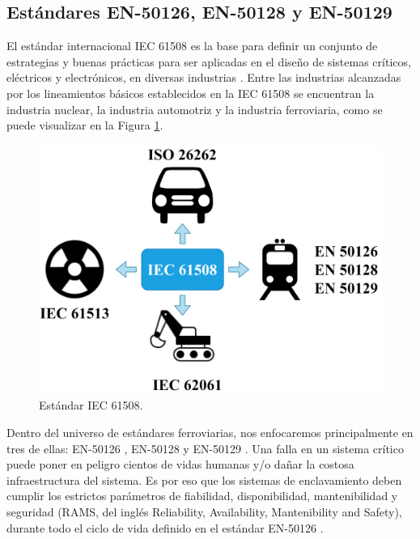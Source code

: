 \subsection{Estándares EN-50126, EN-50128 y EN-50129}
	\label{sec:normas}
	
    El estándar internacional IEC 61508 \cite{Paper_77,Paper_78,Paper_79,Paper_80,Paper_81,Paper_82,Paper_83} es la base para definir un conjunto de estrategias y buenas prácticas para ser aplicadas en el diseño de sistemas críticos, eléctricos y electrónicos, en diversas industrias \cite{Paper_26,Paper_29,Paper_30,Paper_31,Paper_34,Paper_47}. Entre las industrias alcanzadas por los lineamientos básicos establecidos en la IEC 61508 se encuentran la industria nuclear, la industria automotriz y la industria ferroviaria, como se puede visualizar en la Figura \ref{fig:IEC_61508}.

    \begin{figure}[H]
        \centering
        \includegraphics[width=1\textwidth]{Figuras/IEC61508.png}
        \centering\caption{Estándar IEC 61508.}
        \label{fig:IEC_61508}
    \end{figure}

    Dentro del universo de estándares ferroviarias, nos enfocaremos principalmente en tres de ellas: EN-50126 \cite{Paper_70,Paper_71,Paper_72,Paper_73,Paper_74}, EN-50128 \cite{Paper_75,Paper_74} y EN-50129 \cite{Paper_76,Paper_73}. Una falla en un sistema crítico puede poner en peligro cientos de vidas humanas y/o dañar la costosa infraestructura del sistema. Es por eso que los sistemas de enclavamiento deben cumplir los estrictos parámetros de fiabilidad, disponibilidad, mantenibilidad y seguridad (RAMS, del inglés Reliability, Availability, Mantenibility and Safety), durante todo el ciclo de vida definido en el estándar EN-50126 \cite{Paper_70,Paper_66,Paper_84}.

